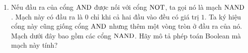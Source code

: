 \begin{enumerate}
\begin{enumerate}
  \item Nếu đầu ra của cổng $\operatorname{\mbox{AND}}$ được nối với cổng $\operatorname{\mbox{NOT}}$, ta gọi nó
    là mạch $\operatorname{\mbox{NAND}}$.  Mạch này có đầu ra là $0$ chỉ khi cả hai đầu vào
    đều có giá trị $1$. Ta ký hiệu cổng này cũng giống cổng $\operatorname{\mbox{AND}}$
    nhưng thêm một vòng tròn ở đầu ra của nó. Mạch dưới đây bao gồm
    các cổng $\operatorname{\mbox{NAND}}$. Hãy mô tả phép toán Boolean mà mạch này tính?
    \begin{center}
    \end{center}

  \end{enumerate}
\end{enumerate}

